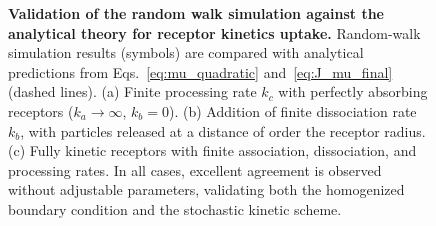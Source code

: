 \begin{figure}[H]
    \centering
    \caption{\textbf{Validation of the random walk simulation against the analytical theory for receptor kinetics uptake.} Random-walk simulation results (symbols) are compared with analytical predictions from Eqs.~\eqref{eq:mu_quadratic} and~\eqref{eq:J_mu_final} (dashed lines). (a) Finite processing rate $k_c$ with perfectly absorbing receptors ($k_a \to \infty$, $k_b = 0$). (b) Addition of finite dissociation rate $k_b$, with particles released at a distance of order the receptor radius. (c) Fully kinetic receptors with finite association, dissociation, and processing rates. In all cases, excellent agreement is observed without adjustable parameters, validating both the homogenized boundary condition and the stochastic kinetic scheme.}
    \label{fig:rw_kinetics}
\end{figure}
